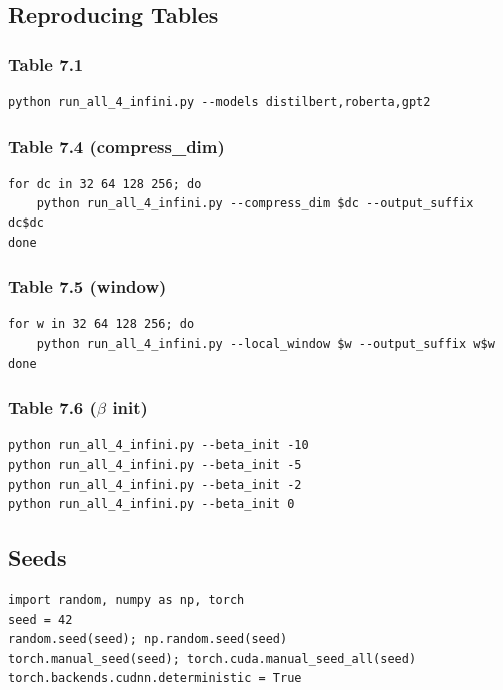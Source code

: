 \subsection{Reproducing Tables}

\subsubsection{Table 7.1}
\begin{lstlisting}
python run_all_4_infini.py --models distilbert,roberta,gpt2
\end{lstlisting}

\subsubsection{Table 7.4 (compress\_dim)}
\begin{lstlisting}
for dc in 32 64 128 256; do
    python run_all_4_infini.py --compress_dim $dc --output_suffix dc$dc
done
\end{lstlisting}

\subsubsection{Table 7.5 (window)}
\begin{lstlisting}
for w in 32 64 128 256; do
    python run_all_4_infini.py --local_window $w --output_suffix w$w
done
\end{lstlisting}

\subsubsection{Table 7.6 ($\beta$ init)}
\begin{lstlisting}
python run_all_4_infini.py --beta_init -10
python run_all_4_infini.py --beta_init -5
python run_all_4_infini.py --beta_init -2
python run_all_4_infini.py --beta_init 0
\end{lstlisting}

\subsection{Seeds}

\begin{lstlisting}
import random, numpy as np, torch
seed = 42
random.seed(seed); np.random.seed(seed)
torch.manual_seed(seed); torch.cuda.manual_seed_all(seed)
torch.backends.cudnn.deterministic = True
\end{lstlisting}

